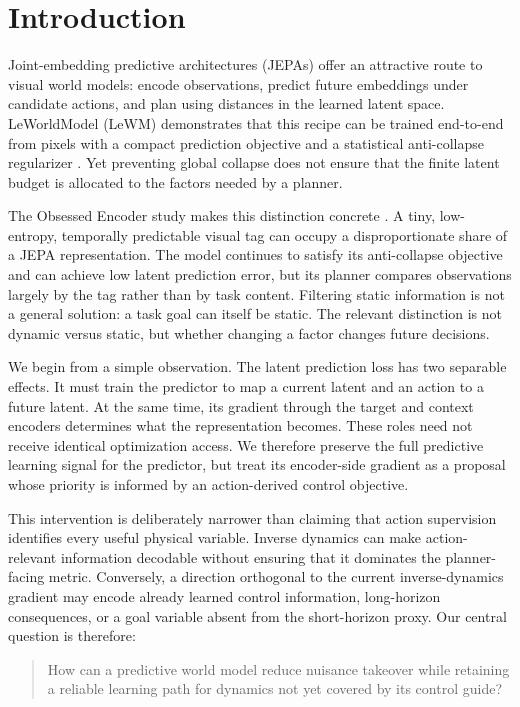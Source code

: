 \section{Introduction}

Joint-embedding predictive architectures (JEPAs) offer an attractive route to
visual world models: encode observations, predict future embeddings under
candidate actions, and plan using distances in the learned latent space.
LeWorldModel (LeWM) demonstrates that this recipe can be trained end-to-end
from pixels with a compact prediction objective and a statistical
anti-collapse regularizer \citep{maes2026leworldmodel}.  Yet preventing global
collapse does not ensure that the finite latent budget is allocated to the
factors needed by a planner.

The Obsessed Encoder study makes this distinction concrete
\citep{enigma2026obsessed}.  A tiny, low-entropy, temporally predictable visual
tag can occupy a disproportionate share of a JEPA representation.  The model
continues to satisfy its anti-collapse objective and can achieve low latent
prediction error, but its planner compares observations largely by the tag
rather than by task content.  Filtering static information is not a general
solution: a task goal can itself be static.  The relevant distinction is not
dynamic versus static, but whether changing a factor changes future decisions.

We begin from a simple observation.  The latent prediction loss has two
separable effects.  It must train the predictor to map a current latent and an
action to a future latent.  At the same time, its gradient through the target
and context encoders determines what the representation becomes.  These roles
need not receive identical optimization access.  We therefore preserve the
full predictive learning signal for the predictor, but treat its encoder-side
gradient as a proposal whose priority is informed by an action-derived control
objective.

This intervention is deliberately narrower than claiming that action
supervision identifies every useful physical variable.  Inverse dynamics can
make action-relevant information decodable without ensuring that it dominates
the planner-facing metric.  Conversely, a direction orthogonal to the current
inverse-dynamics gradient may encode already learned control information,
long-horizon consequences, or a goal variable absent from the short-horizon
proxy.  Our central question is therefore:

\begin{quote}
How can a predictive world model reduce nuisance takeover while retaining a
reliable learning path for dynamics not yet covered by its control guide?
\end{quote}

